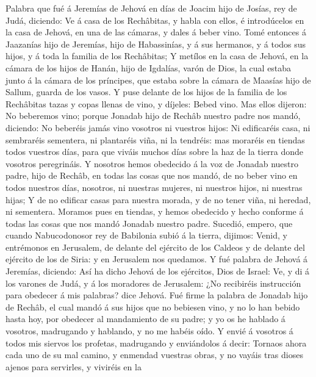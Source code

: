  Palabra que fué á Jeremías de Jehová en días de Joacim
hijo de Josías, rey de Judá, diciendo:  Ve á casa de los
Rechâbitas, y habla con ellos, é introdúcelos en la casa de Jehová, en
una de las cámaras, y dales á beber vino.  Tomé entonces á
Jaazanías hijo de Jeremías, hijo de Habassinías, y á sus hermanos, y á
todos sus hijos, y á toda la familia de los Rechâbitas;  Y
metílos en la casa de Jehová, en la cámara de los hijos de Hanán, hijo
de Igdalías, varón de Dios, la cual estaba junto á la cámara de los
príncipes, que estaba sobre la cámara de Maasías hijo de Sallum, guarda
de los vasos.  Y puse delante de los hijos de la familia
de los Rechâbitas tazas y copas llenas de vino, y díjeles: Bebed vino.
 Mas ellos dijeron: No beberemos vino; porque Jonadab hijo
de Rechâb nuestro padre nos mandó, diciendo: No beberéis jamás vino
vosotros ni vuestros hijos:  Ni edificaréis casa, ni
sembraréis sementera, ni plantaréis viña, ni la tendréis: mas moraréis
en tiendas todos vuestros días, para que viváis muchos días sobre la haz
de la tierra donde vosotros peregrináis.  Y nosotros hemos
obedecido á la voz de Jonadab nuestro padre, hijo de Rechâb, en todas
las cosas que nos mandó, de no beber vino en todos nuestros días,
nosotros, ni nuestras mujeres, ni nuestros hijos, ni nuestras hijas;
 Y de no edificar casas para nuestra morada, y de no tener
viña, ni heredad, ni sementera.  Moramos pues en tiendas,
y hemos obedecido y hecho conforme á todas las cosas que nos mandó
Jonadab nuestro padre.  Sucedió, empero, que cuando
Nabucodonosor rey de Babilonia subió á la tierra, dijimos: Venid, y
entrémonos en Jerusalem, de delante del ejército de los Caldeos y de
delante del ejército de los de Siria: y en Jerusalem nos quedamos.
 Y fué palabra de Jehová á Jeremías, diciendo:
 Así ha dicho Jehová de los ejércitos, Dios de Israel:
Ve, y di á los varones de Judá, y á los moradores de Jerusalem: ¿No
recibiréis instrucción para obedecer á mis palabras? dice Jehová.
 Fué firme la palabra de Jonadab hijo de Rechâb, el cual
mandó á sus hijos que no bebiesen vino, y no lo han bebido hasta hoy,
por obedecer al mandamiento de su padre; y yo os he hablado á vosotros,
madrugando y hablando, y no me habéis oído.  Y envié á
vosotros á todos mis siervos los profetas, madrugando y enviándolos á
decir: Tornaos ahora cada uno de su mal camino, y enmendad vuestras
obras, y no vayáis tras dioses ajenos para servirles, y viviréis en la
